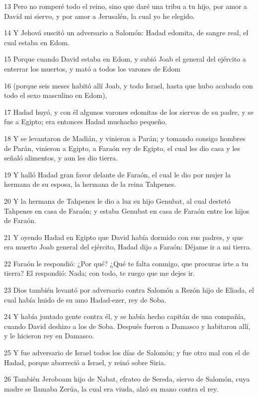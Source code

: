 \par 13 Pero no romperé todo el reino, sino que daré una tribu a tu hijo, por amor a David mi siervo, y por amor a Jerusalén, la cual yo he elegido.
\par 14 Y Jehová suscitó un adversario a Salomón: Hadad edomita, de sangre real, el cual estaba en Edom.
\par 15 Porque cuando David estaba en Edom, y subió Joab el general del ejército a enterrar los muertos, y mató a todos los varones de Edom
\par 16 (porque seis meses habitó allí Joab, y todo Israel, hasta que hubo acabado con todo el sexo masculino en Edom),
\par 17 Hadad huyó, y con él algunos varones edomitas de los siervos de su padre, y se fue a Egipto; era entonces Hadad muchacho pequeño.
\par 18 Y se levantaron de Madián, y vinieron a Parán; y tomando consigo hombres de Parán, vinieron a Egipto, a Faraón rey de Egipto, el cual les dio casa y les señaló alimentos, y aun les dio tierra.
\par 19 Y halló Hadad gran favor delante de Faraón, el cual le dio por mujer la hermana de su esposa, la hermana de la reina Tahpenes.
\par 20 Y la hermana de Tahpenes le dio a luz su hijo Genubat, al cual destetó Tahpenes en casa de Faraón; y estaba Genubat en casa de Faraón entre los hijos de Faraón.
\par 21 Y oyendo Hadad en Egipto que David había dormido con sus padres, y que era muerto Joab general del ejército, Hadad dijo a Faraón: Déjame ir a mi tierra.
\par 22 Faraón le respondió: ¿Por qué? ¿Qué te falta conmigo, que procuras irte a tu tierra? El respondió: Nada; con todo, te ruego que me dejes ir.
\par 23 Dios también levantó por adversario contra Salomón a Rezón hijo de Eliada, el cual había huido de su amo Hadad-ezer, rey de Soba.
\par 24 Y había juntado gente contra él, y se había hecho capitán de una compañía, cuando David deshizo a los de Soba. Después fueron a Damasco y habitaron allí, y le hicieron rey en Damasco.
\par 25 Y fue adversario de Israel todos los días de Salomón; y fue otro mal con el de Hadad, porque aborreció a Israel, y reinó sobre Siria.
\par 26 También Jeroboam hijo de Nabat, efrateo de Sereda, siervo de Salomón, cuya madre se llamaba Zerúa, la cual era viuda, alzó su mano contra el rey.
